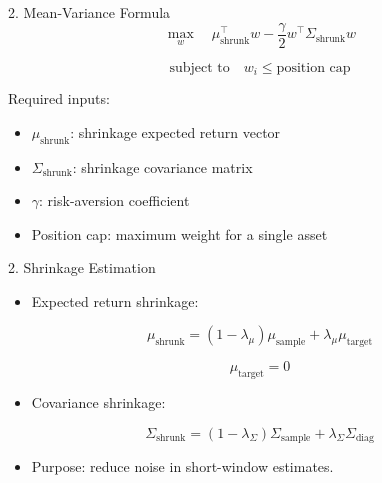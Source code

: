\documentclass[aspectratio=169]{beamer}
\begin{document}
\begin{frame}{2. Mean-Variance Formula}
  \[
    \max_{w}
    \quad
    \mu_{\text{shrunk}}^{\top} w
    -
    \frac{\gamma}{2}
    w^{\top}\Sigma_{\text{shrunk}}w
  \]

  \[
    \text{subject to}
    \quad
    w_i \leq \text{position cap}
  \]

  \vspace{0.4cm}

  Required inputs:
  \begin{itemize}
    \item $\mu_{\text{shrunk}}$: shrinkage expected return vector
    \item $\Sigma_{\text{shrunk}}$: shrinkage covariance matrix
    \item $\gamma$: risk-aversion coefficient
    \item Position cap: maximum weight for a single asset
  \end{itemize}
\end{frame}

\begin{frame}{2. Shrinkage Estimation}
  \begin{itemize}
    \item Expected return shrinkage:
  \end{itemize}

  \[
    \mu_{\text{shrunk}}
    =
    (1-\lambda_{\mu})\mu_{\text{sample}}
    +
    \lambda_{\mu}\mu_{\text{target}}
  \]

  \[
    \mu_{\text{target}} = 0
  \]

  \begin{itemize}
    \item Covariance shrinkage:
  \end{itemize}

  \[
    \Sigma_{\text{shrunk}}
    =
    (1-\lambda_{\Sigma})\Sigma_{\text{sample}}
    +
    \lambda_{\Sigma}\Sigma_{\text{diag}}
  \]

  \begin{itemize}
    \item Purpose: reduce noise in short-window estimates.
  \end{itemize}
\end{frame}
\end{document}
